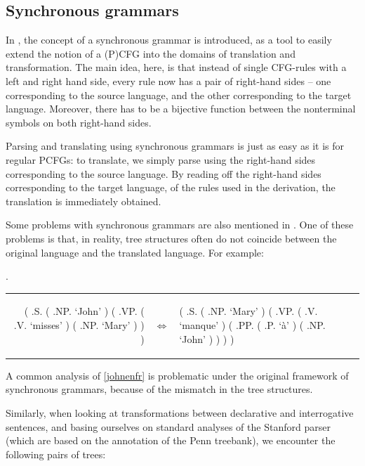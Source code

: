 \documentclass[a4paper]{article}
\theoremstyle{definition}
\begin{document}
\subsection{Synchronous grammars}
\label{subsec:synch}

In \citet{chiang2006introduction}, the concept of a synchronous grammar is
introduced, as a tool to easily extend the notion of a (P)CFG into the domains
of translation and transformation. The main idea, here, is that instead of
single CFG-rules with a left and right hand side, every rule now has a pair of
right-hand sides -- one corresponding to the source language, and the other
corresponding to the target language. Moreover, there has to be a bijective
function between the nonterminal symbols on both right-hand sides.

Parsing and translating using synchronous grammars is just as easy as it is for
regular PCFGs: to translate, we simply parse using the right-hand sides
corresponding to the source language. By reading off the right-hand sides
corresponding to the target language, of the rules used in the derivation, the
translation is immediately obtained.

Some problems with synchronous grammars are also mentioned in
\citet{chiang2006introduction}. One of these problems is that, in reality, tree
structures often do not coincide between the original language and the
translated language. For example:

\ex.
\label{johnenfr}

\begin{tabular}{ r m{3em} l }
\begin{parsetree}
( .S.
	( .NP. `John' )
	( .VP.
		( .V. `misses' )
		( .NP. `Mary' )
	)
)
\end{parsetree}
& $\iff$ &
\begin{parsetree}
( .S.
	( .NP. `Mary' )
	( .VP.
		( .V. `manque' )
		( .PP.
			( .P. `à' )
			( .NP. `John' )
		)
	)
)
\end{parsetree}
\end{tabular}
\vspace{1em}

A common analysis of \ref{johnenfr} is problematic under the original
framework of synchronous grammars, because of the mismatch in the tree
structures.

Similarly, when looking at transformations between declarative and
interrogative sentences, and basing ourselves on standard analyses of the
Stanford parser (which are based on the annotation of the Penn
treebank), we encounter the following pairs of trees:
\end{document}
